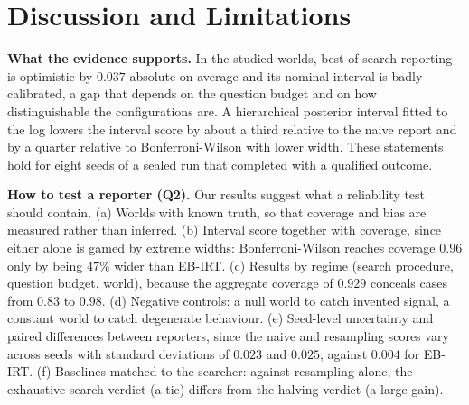 \documentclass{article}
\begin{document}
\section{Discussion and Limitations}\label{sec:limits}
\textbf{What the evidence supports.} In the studied worlds, best-of-search reporting is optimistic by $0.037$ absolute on average and its nominal interval is badly calibrated, a gap that depends on the question budget and on how distinguishable the configurations are. A hierarchical posterior interval fitted to the log lowers the interval score by about a third relative to the naive report and by a quarter relative to Bonferroni-Wilson with lower width. These statements hold for eight seeds of a sealed run that completed with a qualified outcome.

\textbf{How to test a reporter (Q2).} Our results suggest what a reliability test should contain. (a) Worlds with known truth, so that coverage and bias are measured rather than inferred. (b) Interval score together with coverage, since either alone is gamed by extreme widths: Bonferroni-Wilson reaches coverage $0.96$ only by being $47\%$ wider than EB-IRT. (c) Results by regime (search procedure, question budget, world), because the aggregate coverage of $0.929$ conceals cases from $0.83$ to $0.98$. (d) Negative controls: a null world to catch invented signal, a constant world to catch degenerate behaviour. (e) Seed-level uncertainty and paired differences between reporters, since the naive and resampling scores vary across seeds with standard deviations of $0.023$ and $0.025$, against $0.004$ for EB-IRT. (f) Baselines matched to the searcher: against resampling alone, the exhaustive-search verdict (a tie) differs from the halving verdict (a large gain).
\end{document}
